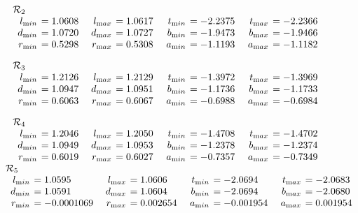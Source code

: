 \begin{remark}
\begin{table}
\begin{small}
$$\begin{array}{rlrlrlrl}\noalign{\noindent  ${\mathcal R}_2$}
\noalign{\vskip2pt}
l_{\textrm min} &\hskip-6pt =  1.0608&\enspace    l_{\textrm max} &\hskip-6pt = 1.0617&\enspace   
t_{\textrm min} &\hskip-6pt =  -2.2375&\enspace    t_{\textrm max} &\hskip-6pt = -2.2366\\
d_{\textrm min} &\hskip-6pt =  1.0720&  d_{\mathrm
max}&\hskip-6pt  = 1.0727&   b_{\textrm min} &\hskip-6pt =  -1.9473&  b_{\textrm max} &\hskip-6pt = -1.9466\\
r_{\textrm min} &\hskip-6pt =  0.5298& 
r_{\textrm max} &\hskip-6pt = 0.5308&   a_{\textrm min} &\hskip-6pt =  -1.1193&  a_{\textrm max} &\hskip-6pt = -1.1182\end{array}$$

$$\begin{array}{rlrlrlrl}
\noalign{\noindent  ${\mathcal R}_3$}
\noalign{\vskip2pt}
l_{\textrm min} &\hskip-6pt =  1.2126&\enspace    l_{\textrm max} &\hskip-6pt = 1.2129&\enspace   
t_{\textrm min} &\hskip-6pt =  -1.3972&\enspace    t_{\textrm max}&\hskip-6pt  = -1.3969\\
d_{\textrm min} &\hskip-6pt =  1.0947&  d_{\mathrm
max}&\hskip-6pt  = 1.0951&   b_{\textrm min} &\hskip-6pt =  -1.1736&  b_{\textrm max}&\hskip-6pt  = -1.1733\\
r_{\textrm min} &\hskip-6pt =  0.6063& 
r_{\textrm max}&\hskip-6pt  = 0.6067&   a_{\textrm min} &\hskip-6pt =  -0.6988&  a_{\textrm max}&\hskip-6pt  = -0.6984\end{array}
$$

$$\begin{array}{rlrlrlrl}
\noalign{\noindent  ${\mathcal R}_4$}
\noalign{\vskip2pt}
l_{\textrm min} &\hskip-6pt =  1.2046&\enspace    l_{\textrm max}&\hskip-6pt  = 1.2050&\enspace   
t_{\textrm min} &\hskip-6pt =  -1.4708&\enspace    t_{\textrm max}&\hskip-6pt = -1.4702\\
d_{\textrm min} &\hskip-6pt =  1.0949&  d_{\mathrm
max}&\hskip-6pt  = 1.0953&   b_{\textrm min} &\hskip-6pt =  -1.2378&  b_{\textrm max} &\hskip-6pt = -1.2374\\
r_{\textrm min} &\hskip-6pt =  0.6019& 
r_{\textrm max} &\hskip-6pt = 0.6027&   a_{\textrm min} &\hskip-6pt =  -0.7357&  a_{\textrm max} &\hskip-6pt = -0.7349\end{array}$$

$$\begin{array}{rlrlrlrl}
\noalign{\vskip-10pt}
\noalign{\noindent  ${\mathcal R}_5$}
\noalign{\vskip2pt}
l_{\textrm min} &\hskip-6pt =  1.0595&\enspace    l_{\textrm max}&\hskip-6pt = 1.0606&\enspace   
t_{\textrm min}&\hskip-6pt =  -2.0694&\enspace   t_{\textrm max} &\hskip-6pt = -2.0683\\
d_{\textrm min} &\hskip-6pt =  1.0591&  d_{\mathrm
max}&\hskip-6pt  = 1.0604&   b_{\textrm min} &\hskip-6pt =  -2.0694&  b_{\textrm max}&\hskip-6pt  = -2.0680\\
r_{\textrm min} &\hskip-6pt =  -0.0001069&  r_{\textrm max} &\hskip-6pt =  0.002654&  a_{\textrm min} &\hskip-6pt =  -0.001954&  a_{\textrm max}
&\hskip-6pt =  0.001954\end{array}$$


\end{small}
\end{table}
\end{remark}
